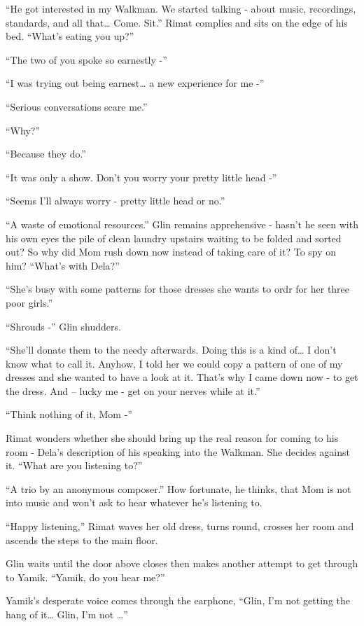 \documentclass[twoside,11pt]{book}
\begin{document}
``He got interested in my Walkman. We started talking - about music, recordings, standards, and all
that{\dots} Come. Sit.'' Rimat complies and sits on the edge of his bed.  ``What's eating you
up?''

``The two of you spoke so earnestly -''

``I was trying out being earnest{\dots} a new experience for me -''

``Serious conversations scare me.''

``Why?''

``Because they do.''

``It was only a show. Don't you worry your pretty little head -''

``Seems I'll always worry - pretty little head or no.''

``A waste of emotional resources.'' Glin remains apprehensive - hasn't he seen with his own
eyes the pile of clean laundry upstairs waiting to be folded and sorted out? So why did Mom rush down now instead of
taking care of it? To spy on him? ``What's with Dela?''

``She's busy with some patterns for those dresses she wants to ordr for her three poor
girls.''

``Shrouds -'' Glin shudders.

``She'll donate them to the needy afterwards. Doing this is a kind of{\dots} I don't know what to call it.
Anyhow, I told her we could copy a pattern of one of my dresses and she wanted to have a look at it. That's why I came
down now - to get the dress.  And -- lucky me - get on your nerves while at it.''

``Think nothing of it, Mom -''

Rimat wonders whether she should bring up the real reason for coming to his room -   Dela's description of his speaking
into the Walkman. She decides against it. ``What are you listening to?''

``A trio by an anonymous composer.'' How fortunate, he thinks, that Mom is not into music and
won't ask to hear whatever he's listening to.

``Happy listening,'' Rimat waves her old dress, turns round, crosses her room and ascends the
steps to the main floor.

Glin waits until the door above closes then makes another attempt to get through to Yamik. ``Yamik, do you
hear me?''

Yamik's desperate voice comes through the earphone, ``Glin, I'm not getting the hang of it{\dots} Glin, I'm
not {\dots}''
\end{document}
